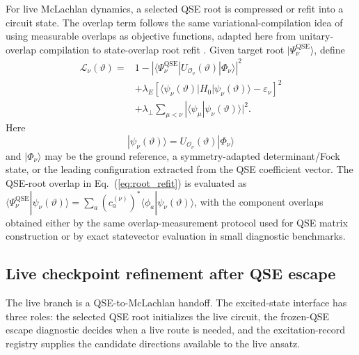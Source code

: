 \documentclass[
  reprint,
  amsmath,
  amssymb,
  aps,
  pra,
  nofootinbib,
  superscriptaddress,
  floatfix
]{revtex4-2}
\newcommand{\Oset}{\mathcal{O}}
\newcommand{\qse}{\mathrm{QSE}}
\newcommand{\ket}[1]{|#1\rangle}
\newcommand{\bra}[1]{\langle #1|}
\newcommand{\braket}[2]{\langle #1|#2\rangle}
\begin{document}
For live McLachlan dynamics, a selected QSE root is compressed or refit into a circuit state.  The overlap term follows the same variational-compilation idea of using measurable overlaps as objective functions, adapted here from unitary-overlap compilation to state-overlap root refit \cite{Khatri2019QAQC}.  Given target root $\ket{\Psi_\nu^{\qse}}$, define
\begin{equation}
\begin{aligned}
\mathcal L_\nu(\vartheta)
={}&
1-
\left|
\bra{\Psi_\nu^{\qse}}
U_{\Oset_\nu}(\vartheta)\ket{\Phi_\nu}
\right|^2
\\
&+
\lambda_E
\left[
\bra{\psi_\nu(\vartheta)}H_0\ket{\psi_\nu(\vartheta)}
-\varepsilon_\nu
\right]^2
\\
&+
\lambda_\perp
\sum_{\mu<\nu}
|\braket{\psi_\mu}{\psi_\nu(\vartheta)}|^2 .
\end{aligned}
\label{eq:root_refit}
\end{equation}
Here
\begin{equation}
\ket{\psi_\nu(\vartheta)}=
U_{\Oset_\nu}(\vartheta)\ket{\Phi_\nu}
\label{eq:excited_live_ansatz}
\end{equation}
and $\ket{\Phi_\nu}$ may be the ground reference, a symmetry-adapted determinant/Fock state, or the leading configuration extracted from the QSE coefficient vector.
The QSE-root overlap in Eq.~(\ref{eq:root_refit}) is evaluated as
$\bra{\Psi_\nu^{\qse}}\psi_\nu(\vartheta)\rangle
=\sum_a(c_a^{(\nu)})^\ast\bra{\phi_a}\psi_\nu(\vartheta)\rangle$,
with the component overlaps obtained either by the same overlap-measurement protocol used for QSE matrix construction or by exact statevector evaluation in small diagnostic benchmarks.


\subsection{Live checkpoint refinement after QSE escape}

The live branch is a QSE-to-McLachlan handoff.  The excited-state interface has three roles: the selected QSE root initializes the live circuit, the frozen-QSE escape diagnostic decides when a live route is needed, and the excitation-record registry supplies the candidate directions available to the live ansatz.
\end{document}
